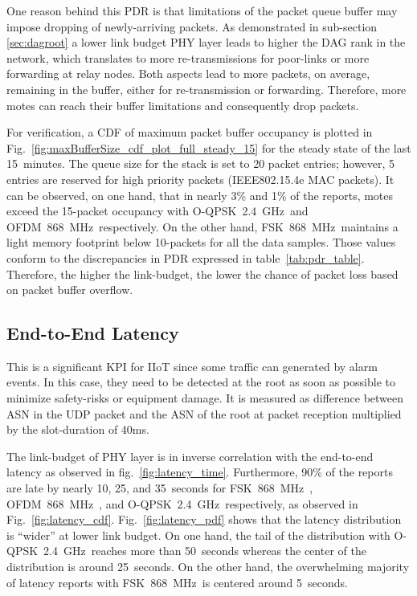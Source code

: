 \documentclass[journal,article,submit,moreauthors,pdftex]{Definitions/mdpi}
\newcommand{\fsk}          {FSK~868~MHz}
\newcommand{\oqpsk}        {O-QPSK~2.4~GHz}
\newcommand{\ofdm}         {OFDM~868~MHz}
\begin{document}

One reason behind this PDR is that limitations of the packet queue buffer may impose dropping of newly-arriving packets.
As demonstrated in sub-section \ref{sec:dagroot} a lower link budget PHY layer leads to higher the DAG rank in the network, which translates to more re-transmissions for poor-links or more forwarding at relay nodes. 
Both aspects lead to more packets, on average, remaining in the buffer, either for re-transmission or forwarding.
Therefore, more motes can reach their buffer limitations and consequently drop packets.


For verification, a CDF of maximum packet buffer occupancy is plotted in Fig.~\ref{fig:maxBufferSize_cdf_plot_full_steady_15} for the steady state of the last 15~minutes. 
The queue size for the stack is set to 20 packet entries; however, 5 entries are reserved for high priority packets (IEEE802.15.4e MAC packets).
It can be observed, on one hand, that in nearly 3\% and 1\% of the reports, motes exceed the 15-packet occupancy with \oqpsk\ and \ofdm\ respectively.
On the other hand, \fsk\ maintains a light memory footprint below 10-packets for all the data samples. 
Those values conform to the discrepancies in PDR expressed in table~\ref{tab:pdr_table}. 
Therefore, the higher the link-budget, the lower the chance of packet loss based on packet buffer overflow. 

\subsection{End-to-End Latency}
\label{sec:latency}


This is a significant KPI for IIoT since some traffic can generated by alarm events.
In this case, they need to be detected at the root as soon as possible to minimize safety-risks or equipment damage.
It is measured as difference between ASN in the UDP packet and the ASN of the root at packet reception multiplied by the slot-duration of 40ms.


The link-budget of PHY layer is in inverse correlation with the end-to-end latency as observed in fig.~\ref{fig:latency_time}.
Furthermore, 90\% of the reports are late by nearly 10, 25, and 35~seconds for \fsk\ , \ofdm\ , and \oqpsk\ respectively, as observed in Fig.~\ref{fig:latency_cdf}.
Fig.~\ref{fig:latency_pdf} shows that the latency distribution is ``wider'' at lower link budget.
On one hand, the tail of the distribution with \oqpsk\  reaches more than 50~seconds whereas the center of the distribution is around 25~seconds.
On the other hand, the overwhelming majority of latency reports with \fsk\ is centered around 5~seconds.
\end{document}
